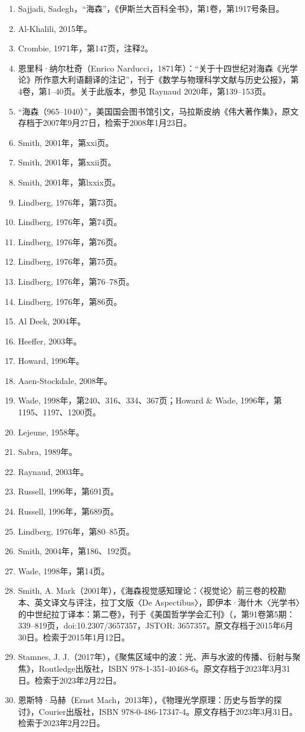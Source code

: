\begin{enumerate}
\item Sajjadi, Sadegh，“海森”，《伊斯兰大百科全书》，第1卷，第1917号条目。
\item Al-Khalili, 2015年。
\item Crombie, 1971年，第147页，注释2。
\item 恩里科·纳尔杜奇（Enrico Narducci，1871年）：“关于十四世纪对海森《光学论》所作意大利语翻译的注记”，刊于《数学与物理科学文献与历史公报》，第4卷，第1–40页。关于此版本，参见 Raynaud 2020年，第139–153页。
\item “海森（965–1040）”，美国国会图书馆引文，马拉斯皮纳《伟大著作集》，原文存档于2007年9月27日，检索于2008年1月23日。
\item Smith, 2001年，第xxi页。
\item Smith, 2001年，第xxii页。
\item Smith, 2001年，第lxxix页。
\item Lindberg, 1976年，第73页。
\item Lindberg, 1976年，第74页。
\item Lindberg, 1976年，第76页。
\item Lindberg, 1976年，第75页。
\item Lindberg, 1976年，第76–78页。
\item Lindberg, 1976年，第86页。
\item Al Deek, 2004年。
\item Heeffer, 2003年。
\item Howard, 1996年。
\item Aaen-Stockdale, 2008年。
\item Wade, 1998年，第240、316、334、367页；Howard & Wade, 1996年，第1195、1197、1200页。
\item Lejeune, 1958年。
\item Sabra, 1989年。
\item Raynaud, 2003年。
\item Russell, 1996年，第691页。
\item Russell, 1996年，第689页。
\item Lindberg, 1976年，第80–85页。
\item Smith, 2004年，第186、192页。
\item Wade, 1998年，第14页。
\item Smith, A. Mark（2001年），《海森视觉感知理论：〈视觉论〉前三卷的校勘本、英文译文与评注，拉丁文版〈De Aspectibus〉，即伊本·海什木〈光学书〉的中世纪拉丁译本：第二卷》，刊于《美国哲学学会汇刊》（，第91卷第5期：339–819页，doi:10.2307/3657357，JSTOR: 3657357。原文存档于2015年6月30日。检索于2015年1月12日。
\item Stamnes, J. J.（2017年），《聚焦区域中的波：光、声与水波的传播、衍射与聚焦》，Routledge出版社，ISBN 978-1-351-40468-6。原文存档于2023年3月31日。检索于2023年2月22日。
\item 恩斯特·马赫（Ernst Mach，2013年），《物理光学原理：历史与哲学的探讨》，Courier出版社，ISBN 978-0-486-17347-4。原文存档于2023年3月31日。检索于2023年2月22日。



\end{enumerate}
